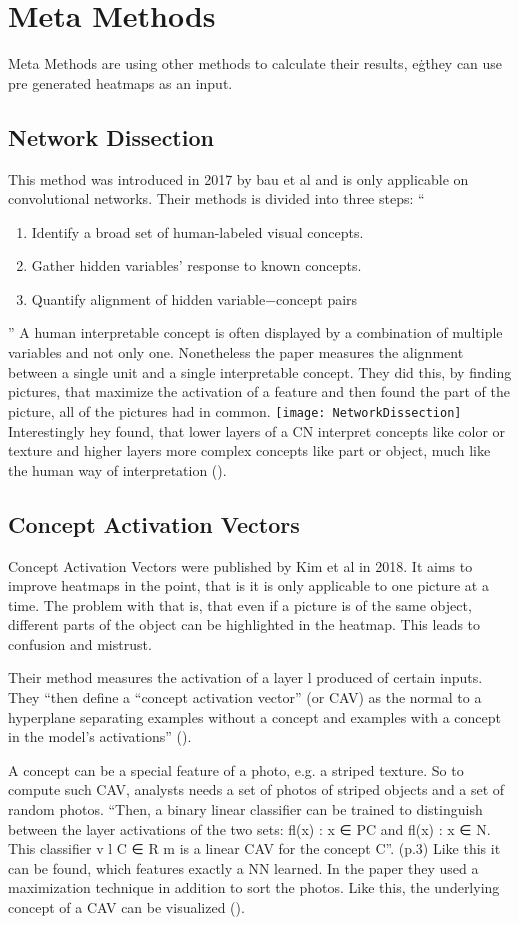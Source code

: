 \section{Meta Methods}
Meta Methods are using other methods to calculate their results, e\.g\. they can use pre generated heatmaps as an input.

\subsection{Network Dissection}
This method was introduced in 2017 by bau et al and is only applicable on convolutional networks. Their methods is divided into three steps: 
“
\begin{enumerate}
    \item  Identify a broad set of human-labeled visual concepts. 
    \item Gather hidden variables’ response to known concepts.
    \item Quantify alignment of hidden variable−concept pairs
\end{enumerate}
”
A human interpretable concept is often displayed by a combination of multiple variables and not only one. Nonetheless the paper measures the alignment between a single unit and a single interpretable concept. 
They did this, by finding pictures, that maximize the activation of a feature and then found the part of the picture, all of the pictures had in common.
\texttt{[image: NetworkDissection]}
Interestingly hey found, that lower layers of a CN interpret concepts like color or texture and higher layers more complex concepts like part or object, much like the human way of interpretation ().

\subsection{Concept Activation Vectors}
Concept Activation Vectors were published by Kim et al in 2018. It aims to improve heatmaps in the point, that is it is only applicable to one picture at a time. The problem with that is, that even if a picture is of the same object, different parts of the object can be highlighted in the heatmap. This leads to confusion and mistrust.
\par
Their method measures the activation of a layer l produced of certain inputs. They “then define a “concept activation vector” (or CAV) as the normal to a hyperplane separating examples without a concept and examples with a concept in the model’s activations” ().
\par
A concept can be a special feature of a photo, e.g. a striped texture. So to compute such CAV, analysts needs a set of photos of striped objects and a set of random photos.
“Then, a binary linear classifier can be trained to distinguish between the layer activations of the two sets: {fl(x) : x ∈ PC } and {fl(x) : x ∈ N}. This classifier v l C ∈ R m is a linear CAV for the concept C”. (p.3) Like this it can be found, which features exactly a NN learned.
In the paper they used a maximization technique in addition to sort the photos. Like this, the  underlying concept of a CAV can be visualized ().

